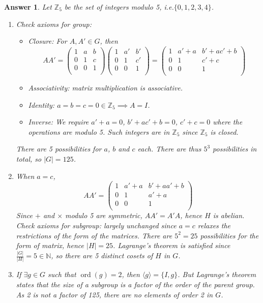 \documentclass[a4paper]{article}
\DeclareMathOperator{\ord}{ord}
\newtheorem{ans}{Answer}[section]
\theoremstyle{new}
\begin{document}
\begin{ans}\leavevmode
Let $\mathbb{Z}_5$ be the set of integers modulo 5, i.e.$\{0,1,2,3,4\}$.
\begin{enumerate}[label=(\alph*)]
\item Check axioms for group:
\begin{itemize}
    \item Closure: For $A,A'\in G$, then 
    $$AA'=\begin{pmatrix}1&a&b\\0&1&c\\0&0&1\\\end{pmatrix}\begin{pmatrix}1&a'&b'\\0&1&c'\\0&0&1\\\end{pmatrix}=\begin{pmatrix}1&a'+a&b'+ac'+b\\0&1&c'+c\\0&0&1\\\end{pmatrix}$$
    \item Associativity: matrix multiplication is associative.
    \item Identity: $a=b=c=0\in\mathbb{Z}_5\implies A=I$.
    \item Inverse: We require $a'+a=0$, $b'+ac'+b=0$, $c'+c=0$ where the operations are modulo 5. Such integers are in $\mathbb{Z}_5$ since $\mathbb{Z}_5$ is closed.
\end{itemize}
There are 5 possibilities for $a$, $b$ and $c$ each. There are thus $5^3$ possibilities in total, so $|G|=125$.
\item When $a=c$, 
$$AA'=\begin{pmatrix}1&a'+a&b'+aa'+b\\0&1&a'+a\\0&0&1\\\end{pmatrix}$$
Since $+$ and $\times$ modulo 5 are symmetric, $AA'=A'A$, hence $H$ is abelian. Check axioms for subgroup: largely unchanged since $a=c$ relaxes the restrictions of the form of the matrices. There are $5^2=25$ possibilities for the form of matrix, hence $|H|=25$. Lagrange's theorem is satisfied since $\frac{|G|}{|H|}=5\in\mathbb{N}$, so there are 5 distinct cosets of $H$ in $G$.
\item If $\exists g\in G$ such that $\ord(g)=2$, then $\langle g\rangle=\{I,g\}$. But Lagrange's theorem states that the size of a subgroup is a factor of the order of the parent group. As 2 is not a factor of 125, there are no elements of order 2 in $G$.\\[5pt]

\end{enumerate}
\end{ans}
\end{document}
